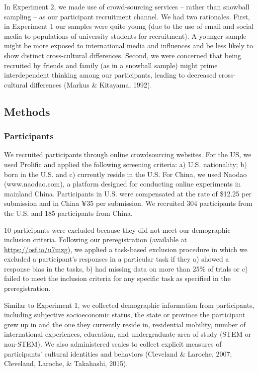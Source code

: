 \documentclass[
  man]{apa6}
\begin{document}
In Experiment 2, we made use of crowd-sourcing services -- rather than snowball sampling -- as our participant recruitment channel. We had two rationales. First, in Experiment 1 our samples were quite young (due to the use of email and social media to populations of university students for recruitment). A younger sample might be more exposed to international media and influences and be less likely to show distinct cross-cultural differences. Second, we were concerned that being recruited by friends and family (as in a snowball sample) might prime interdependent thinking among our participants, leading to decreased cross-cultural differences (Markus \& Kitayama, 1992).

\hypertarget{methods-1}{%
\subsection{Methods}\label{methods-1}}

\hypertarget{participants-1}{%
\subsubsection{Participants}\label{participants-1}}

We recruited participants through online crowdsourcing websites. For the US, we used Prolific and applied the following screening criteria: a) U.S. nationality; b) born in the U.S. and c) currently reside in the U.S. For China, we used Naodao (www.naodao.com), a platform designed for conducting online experiments in mainland China. Participants in U.S. were compensated at the rate of \$12.25 per submission and in China ¥35 per submission. We recruited 304 participants from the U.S. and 185 participants from China.

10 participants were excluded because they did not meet our demographic inclusion criteria. Following our preregistration (available at \url{https://osf.io/u7mzg}), we applied a task-based exclusion procedure in which we excluded a participant's responses in a particular task if they a) showed a response bias in the tasks, b) had missing data on more than 25\% of trials or c) failed to meet the inclusion criteria for any specific task as specified in the preregistration.

Similar to Experiment 1, we collected demographic information from participants, including subjective socioeconomic status, the state or province the participant grew up in and the one they currently reside in, residential mobility, number of international experiences, education, and undergraduate area of study (STEM or non-STEM). We also administered scales to collect explicit measures of participants' cultural identities and behaviors (Cleveland \& Laroche, 2007; Cleveland, Laroche, \& Takahashi, 2015).
\end{document}
